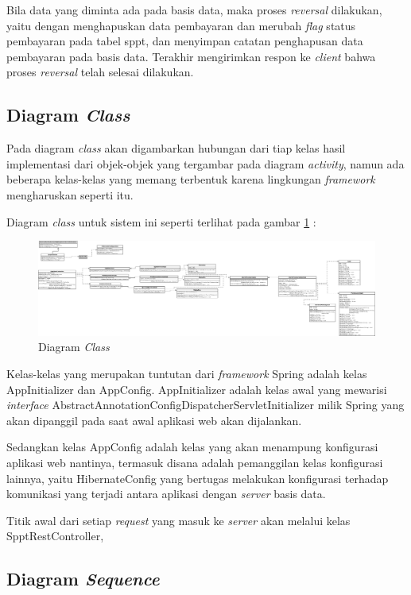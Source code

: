 \documentclass[pdftex,12pt, oneside]{article}
\begin{document}
Bila data yang diminta ada pada basis data, maka proses \textit{reversal} dilakukan, yaitu dengan menghapuskan data pembayaran dan merubah \textit{flag} status pembayaran pada tabel sppt, dan menyimpan catatan penghapusan data pembayaran pada basis data. Terakhir mengirimkan respon ke \textit{client} bahwa proses \textit{reversal} telah selesai dilakukan.

\subsection{Diagram \textit{Class}}

Pada diagram \textit{class} akan digambarkan hubungan dari tiap kelas hasil implementasi dari objek-objek yang tergambar pada diagram \textit{activity}, namun ada beberapa kelas-kelas yang memang terbentuk karena lingkungan \textit{framework} mengharuskan seperti itu.

Diagram \textit{class} untuk sistem ini seperti terlihat pada gambar \ref{fig:uml-class} :

\begin{figure}[H]
  \centering
  \includegraphics[width=1\textwidth]{./resources/uml/uml-class}
  \caption{Diagram \textit{Class}}
  \label{fig:uml-class}
\end{figure}

Kelas-kelas yang merupakan tuntutan dari \textit{framework} Spring adalah kelas AppInitializer dan AppConfig. AppInitializer adalah kelas awal yang mewarisi \textit{interface} AbstractAnnotationConfigDispatcherServletInitializer milik Spring yang akan dipanggil pada saat awal aplikasi web akan dijalankan.

Sedangkan kelas AppConfig adalah kelas yang akan menampung konfigurasi aplikasi web nantinya, termasuk disana adalah pemanggilan kelas konfigurasi lainnya, yaitu HibernateConfig yang bertugas melakukan konfigurasi terhadap komunikasi yang terjadi antara aplikasi dengan \textit{server} basis data.

Titik awal dari setiap \textit{request} yang masuk ke \textit{server} akan melalui kelas SpptRestController, 
\subsection{Diagram \textit{Sequence}}
\end{document}
